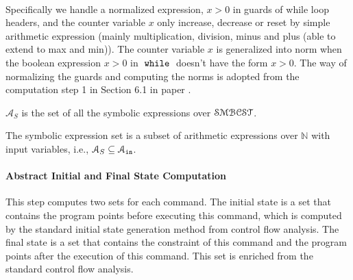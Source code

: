   \\
Specifically 
we handle a 
normalized expression, $x > 0$
in guards of while loop headers, and 
the counter variable $x$ only increase, decrease or reset by 
simple arithmetic expression (mainly multiplication, division, minus and plus (able to extend to max and min)). 
The counter variable $x$ is generalized into norm when the boolean expression $x > 0$
in $\;\mathtt{while}\;$ doesn't have the form $x > 0$.
The way of normalizing the guards and computing the norms is adopted from the computation step 1 in Section 6.1 in paper \cite{sinn2017complexity}. 
\begin{defn}
  $\mathcal{A}_{S}$ is the set of all the symbolic expressions 
over $\mathcal{SMBCST}$.
\end{defn}
The symbolic expression set is a subset of arithmetic expressions over $\mathbb{N}$ with input variables, 
i.e., $\mathcal{A}_{S} \subseteq \mathcal{A}_{\mathtt{in}}$.

\paragraph{Abstract Initial and Final State Computation}
This step computes two sets for each command. 
The initial state is a set that contains the
program points before executing this command, which is computed by the standard initial state generation method from control flow analysis.
The final state is a set
that contains the constraint of this command and the program points after the execution of this command.
This set is enriched 
from the standard control flow analysis.

